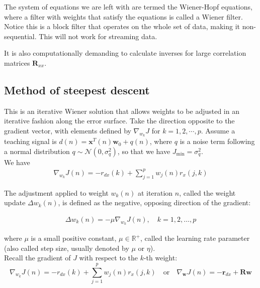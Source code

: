 The system of equations we are left with are termed the Wiener-Hopf equations, where a filter with weights that satisfy the equations is called a Wiener filter. Notice this is a block filter that operates on the whole set of data, making it non-sequential. This will not work for streaming data.

It is also computationally demanding to calculate inverses for large correlation matrices $\mathbf{R}_{xx}$.

\subsection{Method of steepest descent}
This is an iterative Wiener solution that allows weights to be adjusted in an iterative fashion along the error surface. Take the direction opposite to the gradient vector, with elements defined by $\nabla_{w_k}J$ for $k=1,2,\cdots,p$. Assume a teaching signal is \( d(n) = \mathbf{x}^T(n) \mathbf{w}_0 + q(n) \), where \( q \) is a noise term following a normal distribution \( q \sim \mathcal{N}(0, \sigma_q^2) \), so that we have \( J_{\text{min}} = \sigma_q^2 \).\\

We have 
\begin{align}
    \nabla_{w_k}J(n)=-r_{dx}(k)+\sum_{j=1}^pw_j(n)r_x(j,k)
\end{align}

The adjustment applied to weight $w_k(n)$ at iteration $n$, called the weight update $\Delta w_k(n)$, is defined as the negative, opposing direction of the gradient:

\begin{align}
    \Delta w_k(n)=-\mu\nabla_{w_k}J(n),\quad k=1,2,\ldots,p
\end{align}

where \(\mu\) is a small positive constant, \(\mu \in \mathbb{R}^+\), called the learning rate parameter (also called step size, usually denoted by \(\mu\) or \(\eta\)).\\


Recall the gradient of \( J \) with respect to the \( k \)-th weight:
\begin{equation}
\nabla_{w_k} J(n) = -r_{dx}(k) + \sum_{j=1}^p w_j(n)r_x(j, k) \quad \text{or} \quad \nabla_{\mathbf{w}} J(n) = -\mathbf{r}_{dx} + \mathbf{R}\mathbf{w}
\end{equation}

